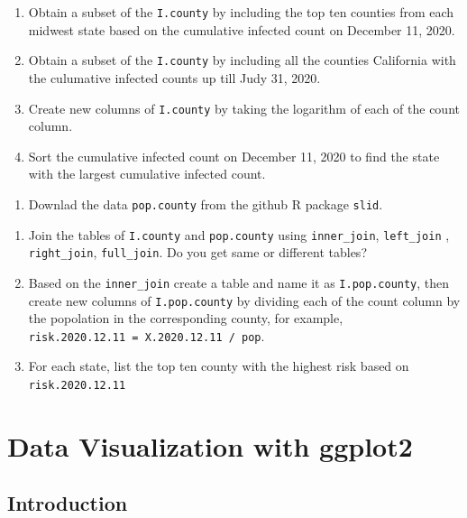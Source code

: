 \documentclass[]{book}
\providecommand{\tightlist}{%
  \setlength{\itemsep}{0pt}\setlength{\parskip}{0pt}}
\begin{document}
\begin{enumerate}
\def\labelenumi{(\alph{enumi})}
\setcounter{enumi}{3}
\item
  Obtain a subset of the \texttt{I.county} by including the top ten
  counties from each midwest state based on the cumulative infected
  count on December 11, 2020.
\item
  Obtain a subset of the \texttt{I.county} by including all the counties
  California with the culumative infected counts up till Judy 31, 2020.
\item
  Create new columns of \texttt{I.county} by taking the logarithm of
  each of the count column.
\item
  Sort the cumulative infected count on December 11, 2020 to find the
  state with the largest cumulative infected count.
\end{enumerate}

\begin{enumerate}
\def\labelenumi{\arabic{enumi}.}
\setcounter{enumi}{1}
\tightlist
\item
  Downlad the data \texttt{pop.county} from the github R package
  \texttt{slid}.
\end{enumerate}

\begin{enumerate}
\def\labelenumi{(\alph{enumi})}
\item
  Join the tables of \texttt{I.county} and \texttt{pop.county} using
  \texttt{inner\_join}, \texttt{left\_join} , \texttt{right\_join},
  \texttt{full\_join}. Do you get same or different tables?
\item
  Based on the \texttt{inner\_join} create a table and name it as
  \texttt{I.pop.county}, then create new columns of
  \texttt{I.pop.county} by dividing each of the count column by the
  popolation in the corresponding county, for example,
  \texttt{risk.2020.12.11\ =\ X.2020.12.11\ /\ pop}.
\item
  For each state, list the top ten county with the highest risk based on
  \texttt{risk.2020.12.11}
\end{enumerate}

\chapter{Data Visualization with ggplot2}\label{ggplot2}

\section{Introduction}\label{introduction}
\end{document}
